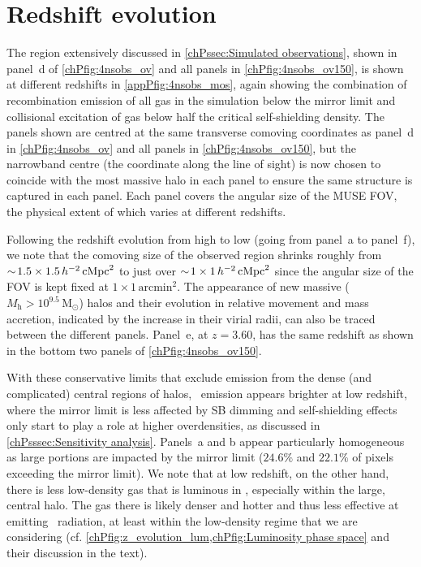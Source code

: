 \section{Redshift evolution}
\label{appPsec:Redshift evolution}

The region extensively discussed in \cref{chPssec:Simulated observations}, shown in panel~d of \cref{chPfig:4nsobs_ov} and all panels in \cref{chPfig:4nsobs_ov150}, is shown at different redshifts in \cref{appPfig:4nsobs_mos}, again showing the combination of recombination emission of all gas in the simulation below the mirror limit and collisional excitation of gas below half the critical self-shielding density. The panels shown are centred at the same transverse comoving coordinates as panel~d in \cref{chPfig:4nsobs_ov} and all panels in \cref{chPfig:4nsobs_ov150}, but the narrowband centre (the coordinate along the line of sight) is now chosen to coincide with the most massive halo in each panel to ensure the same structure is captured in each panel. Each panel covers the angular size of the MUSE FOV, the physical extent of which varies at different redshifts.

Following the redshift evolution from high to low (going from panel~a to panel~f), we note that the comoving size of the observed region shrinks roughly from $\sim \! 1.5 \times 1.5 \, h^{-2} \, \mathrm{cMpc}^2$ to just over $\sim \! 1 \times 1 \, h^{-2} \, \mathrm{cMpc}^2$ since the angular size of the FOV is kept fixed at $1 \times 1 \, \mathrm{arcmin}^2$. The appearance of new massive ($M_\mathrm{h} > 10^{9.5} \, \mathrm{M_\odot}$) halos and their evolution in relative movement and mass accretion, indicated by the increase in their virial radii, can also be traced between the different panels. Panel~e, at $z=3.60$, has the same redshift as shown in the bottom two panels of \cref{chPfig:4nsobs_ov150}.

With these conservative limits that exclude emission from the dense (and complicated) central regions of halos, \lya\ emission appears brighter at low redshift, where the mirror limit is less affected by SB dimming and self-shielding effects only start to play a role at higher overdensities, as discussed in \cref{chPsssec:Sensitivity analysis}. Panels~a and b appear particularly homogeneous as large portions are impacted by the mirror limit ($24.6\%$ and $22.1\%$ of pixels exceeding the mirror limit). We note that at low redshift, on the other hand, there is less low-density gas that is luminous in \lya, especially within the large, central halo. The gas there is likely denser and hotter and thus less effective at emitting \lya\ radiation, at least within the low-density regime that we are considering (cf. \cref{chPfig:z_evolution_lum,chPfig:Luminosity phase space} and their discussion in the text).